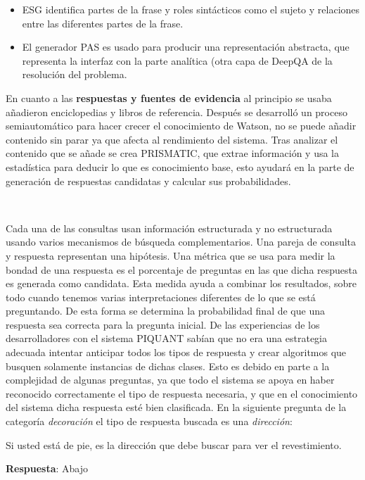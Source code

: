 \documentclass[paper=a4, fontsize=10pt]{scrartcl} %
\numberwithin{equation}{section} %
\numberwithin{figure}{section} %
\numberwithin{table}{section} %
\begin{document}
\begin{itemize}
	\item ESG identifica partes de la frase y roles sintácticos como el sujeto y relaciones entre las diferentes partes de la frase.
	\item El generador PAS es usado para producir una representación abstracta, que representa la interfaz con la parte analítica (otra capa de DeepQA de la resolución del problema.
\end{itemize}

En cuanto a las \textbf{respuestas y fuentes de evidencia} al principio se usaba añadieron enciclopedias y libros de referencia. Después se desarrolló un proceso semiautomático para hacer crecer el conocimiento de Watson, no se puede añadir contenido sin parar ya que afecta al rendimiento del sistema.
Tras analizar el contenido que se añade se crea PRISMATIC, que extrae información y usa la estadística para deducir lo que es conocimiento base, esto ayudará en la parte de generación de respuestas candidatas y calcular sus probabilidades.

\

Cada una de las consultas usan información estructurada y no estructurada usando varios mecanismos de búsqueda complementarios.
Una pareja de consulta y respuesta representan una hipótesis.
Una métrica %
que se usa para medir la bondad de una respuesta es el porcentaje de preguntas en las que dicha respuesta es generada como candidata. 
Esta medida ayuda a combinar los resultados, sobre todo cuando tenemos varias interpretaciones diferentes de lo que se está preguntando.
De esta forma se determina la probabilidad final de que una respuesta sea correcta para la pregunta inicial.
De las experiencias de los desarrolladores con el sistema PIQUANT sabían que no era una estrategia adecuada intentar anticipar todos los tipos de respuesta y crear algoritmos que busquen solamente instancias de dichas clases.
Esto es debido en parte a la complejidad de algunas preguntas, ya que todo el sistema se apoya en haber reconocido correctamente el tipo de respuesta necesaria, y que en el conocimiento del sistema dicha respuesta esté bien clasificada.
En la siguiente pregunta de la categoría \textit{decoración} el tipo de respuesta buscada es una \textit{dirección}:

\begin{center}
Si usted está de pie, es la dirección que debe buscar para ver el revestimiento.

\textbf{Respuesta}: Abajo
\end{center}
\end{document}
